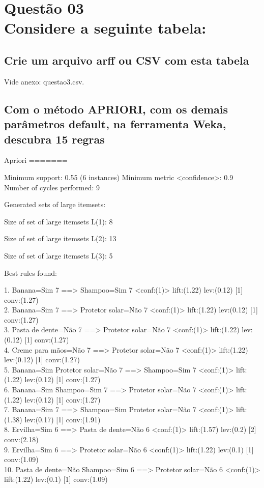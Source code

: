 \documentclass[12pt]{article}
\begin{document}
\section{Questão 03\\
  Considere a seguinte tabela:
 }

\subsection{Crie um arquivo arff ou CSV com esta tabela}
Vide anexo: questao3.csv.

\subsection{Com o método APRIORI, com os demais parâmetros default, na ferramenta Weka, descubra 15 regras}
Apriori
=======

Minimum support: 0.55 (6 instances)
Minimum metric <confidence>: 0.9
Number of cycles performed: 9

Generated sets of large itemsets:

Size of set of large itemsets L(1): 8

Size of set of large itemsets L(2): 13

Size of set of large itemsets L(3): 5

Best rules found:

1. Banana=Sim 7 ==>  Shampoo=Sim 7    <conf:(1)> lift:(1.22) lev:(0.12) [1] conv:(1.27)\\
2. Banana=Sim 7 ==>  Protetor solar=Não 7    <conf:(1)> lift:(1.22) lev:(0.12) [1] conv:(1.27)\\
3.  Pasta de dente=Não 7 ==>  Protetor solar=Não 7    <conf:(1)> lift:(1.22) lev:(0.12) [1] conv:(1.27)\\
4.  Creme para mãos=Não 7 ==>  Protetor solar=Não 7    <conf:(1)> lift:(1.22) lev:(0.12) [1] conv:(1.27)\\
5. Banana=Sim  Protetor solar=Não 7 ==>  Shampoo=Sim 7    <conf:(1)> lift:(1.22) lev:(0.12) [1] conv:(1.27)\\
6. Banana=Sim  Shampoo=Sim 7 ==>  Protetor solar=Não 7    <conf:(1)> lift:(1.22) lev:(0.12) [1] conv:(1.27)\\
7. Banana=Sim 7 ==>  Shampoo=Sim  Protetor solar=Não 7    <conf:(1)> lift:(1.38) lev:(0.17) [1] conv:(1.91)\\
8.  Ervilha=Sim 6 ==>  Pasta de dente=Não 6    <conf:(1)> lift:(1.57) lev:(0.2) [2] conv:(2.18)\\
9.  Ervilha=Sim 6 ==>  Protetor solar=Não 6    <conf:(1)> lift:(1.22) lev:(0.1) [1] conv:(1.09)\\
10.  Pasta de dente=Não  Shampoo=Sim 6 ==>  Protetor solar=Não 6    <conf:(1)> lift:(1.22) lev:(0.1) [1] conv:(1.09)\\
\end{document}
